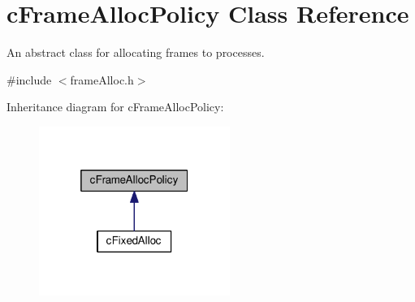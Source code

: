 \hypertarget{classcFrameAllocPolicy}{\section{c\-Frame\-Alloc\-Policy \-Class \-Reference}
\label{d3/dd2/classcFrameAllocPolicy}
}


\-An abstract class for allocating frames to processes.  




{\ttfamily \#include $<$frame\-Alloc.\-h$>$}



\-Inheritance diagram for c\-Frame\-Alloc\-Policy\-:\nopagebreak
\begin{figure}[H]
\begin{center}
\leavevmode
\includegraphics[width=176pt]{d1/d2b/classcFrameAllocPolicy__inherit__graph}
\end{center}
\end{figure}
